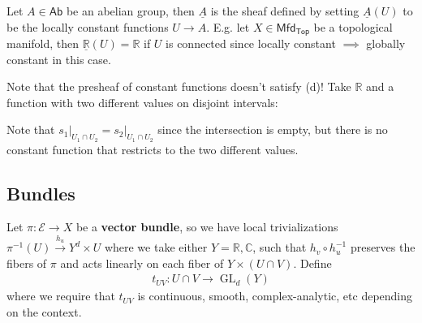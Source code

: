 \begin{example}

Let \(A\in {\mathsf{Ab}}\) be an abelian group, then \(\underline{A}\)
is the sheaf defined by setting \(\underline{A}(U)\) to be the locally
constant functions \(U\to A\). E.g. let
\(X \in {\mathsf{Mfd}}_{{\mathsf{Top}}}\) be a topological manifold,
then \(\underline{{\mathbb{R}}}(U) = {\mathbb{R}}\) if \(U\) is
connected since locally constant \(\implies\) globally constant in this
case.

\end{example}

\begin{warnings}

Note that the presheaf of constant functions doesn't satisfy (d)! Take
\({\mathbb{R}}\) and a function with two different values on disjoint
intervals:

\begin{figure}
\centering
{}
\end{figure}

Note that
\({ \left.{{s_1}} \right|_{{U_1 \cap U_2}} } = { \left.{{s_2}} \right|_{{U_1 \cap U_2}} }\)
since the intersection is empty, but there is no constant function that
restricts to the two different values.

\end{warnings}

\hypertarget{bundles}{%
\subsection{Bundles}\label{bundles}}

\begin{remark}

Let \(\pi: \mathcal{E}\to X\) be a \textbf{vector bundle}, so we have
local trivializations \(\pi ^{-1} (U) \xrightarrow{h_u} Y^d \times U\)
where we take either \(Y={\mathbb{R}}, {\mathbb{C}}\), such that
\(h_v \circ h_u ^{-1}\) preserves the fibers of \(\pi\) and acts
linearly on each fiber of \(Y\times(U \cap V)\). Define
\begin{align*}
t_{UV}: U \cap V \to \operatorname{GL}_d(Y)
\end{align*}
where we require that \(t_{UV}\) is continuous, smooth,
complex-analytic, etc depending on the context.

\begin{figure}
\centering
{}
\end{figure}

\end{remark}

